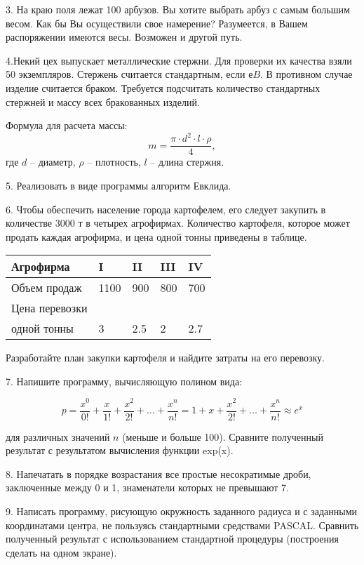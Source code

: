 3. На краю поля лежат 100 арбузов. Вы хотите выбрать арбуз с самым большим весом. Как бы Вы осуществили свое намерение? Разумеется, в Вашем распоряжении имеются весы. Возможен и другой путь.
    
4.Некий цех выпускает металлические стержни. Для проверки их качества взяли 50 экземпляров. Стержень считается стандартным, если е$B$. В противном случае изделие считается браком. Требуется подсчитать количест­во стандартных стержней и массу всех бракованных изделий.

Формула для расчета массы:   $$m = \frac{\pi\cdot d^2\cdot l\cdot \rho}{4}, $$
где $d$ -- диаметр, $\rho$ -- плотность,   $l$ -- длина стержня.

5. Реализовать в виде программы алгоритм Евклида.

6. Чтобы обеспечить население города картофелем, его следу­ет закупить в количестве 3000 т в четырех агрофирмах. Количест­во картофеля, которое может продать каждая агрофирма, и цена одной тонны приведены в таблице.

\begin{center}
\begin{tabular}{ | l | l | l |  l |  l |} \hline
Агрофирма & I  &  II  &  III  &  IV   \\   \hline
Объем продаж & 1100  &  900  &  800  &  700   \\   \hline
Цена перевозки &    &     &     &      \\   
одной тонны & 3  &  2.5  &  2  &  2.7     \\   \hline
\end{tabular}
\end{center}
\vspace{5mm}

Разработайте план закупки картофеля и найдите затраты на его перевозку.

7. Напишите программу, вычисляющую полином вида:

$$ p = \frac{x^0}{0!}+\frac{x}{1!}+\frac{x^2}{2!}+ \ldots + \frac{x^n}{n!} = 1 + x + \frac{x^2}{2!} + \ldots + \frac{x^n}{n!}  \approx e^x$$


для различных значений $n$ (меньше и больше 100). Сравните полученный результат с результатом вычисления функции exp(x).


8. Напечатать в порядке возрастания все простые несократимые дроби, заключенные между 0 и 1, знаменатели которых не превышают 7.
    
9. Написать программу, рисующую окружность заданного радиуса и с заданными координатами центра, не пользуясь стандартными средствами PASCAL. Сравнить полученный результат с использованием стандартной процедуры (построения сделать на одном экране).

